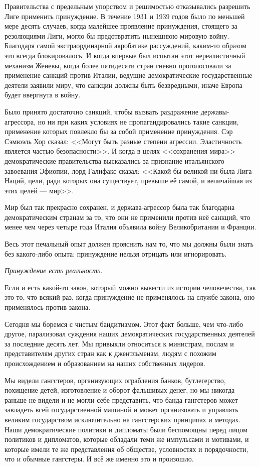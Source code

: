 Правительства с предельным упорством и решимостью отказывались разрешить Лиге применить принуждение. В течение 1931 и 1939 годов было по меньшей мере десять случаев, когда малейшее проявление принуждения, стоящего за резолюциями Лиги, могло бы предотвратить нынешнюю мировую войну. Благодаря самой экстраординарной акробатике рассуждений, каким-то образом это всегда блокировалось. И когда впервые был испытан этот нереалистичный механизм Женевы, когда более пятидесяти стран гневно проголосовали за применение санкций против Италии, ведущие демократические государственные деятели заявили миру, что санкции должны быть безвредными, иначе Европа будет ввергнута в войну.

Было принято достаточно санкций, чтобы вызвать раздражение державы-агрессора, но ни при каких условиях не пропагандировались такие санкции, применение которых повлекло бы за собой применение принуждения. Сэр Сэмюэль Хор сказал: <<Могут быть разные степени агрессии. Эластичность является частью безопасности>>. И когда в целях <<сохранения мира>> демократические правительства высказались за признание итальянского завоевания Эфиопии, лорд Галифакс сказал: <<Какой бы великой ни была Лига Наций, цели, ради которых она существует, превыше её самой, и величайшая из этих целей — мир>>.

Мир был так прекрасно сохранен, и держава-агрессор была так благодарна демократическим странам за то, что они не применили против неё санкций, что менее чем через четыре года Италия объявила войну Великобритании и Франции.

Весь этот печальный опыт должен прояснить нам то, что мы должны были знать без какого-либо опыта: принуждение нельзя отрицать или игнорировать.

\textit{Принуждение есть реальность}.

Если и есть какой-то закон, который можно вывести из истории человечества, так это то, что всякий раз, когда принуждение не применялось на службе закона, оно применялось против закона.

Сегодня мы боремся с чистым бандитизмом. Этот факт больше, чем что-либо другое, парализовал суждения наших демократических государственных деятелей за последние десять лет. Мы привыкли относиться к министрам, послам и представителям других стран как к джентльменам, людям с похожим происхождением и образованием на наших собственных лидеров.

Мы видели гангстеров, организующих ограбления банков, бутлегерство, похищение детей, изготовление и оборот фальшивых денег, но мы никогда раньше не видели и не могли себе представить, что банда гангстеров может завладеть всей государственной машиной и может организовать и управлять великим государством исключительно на гангстерских принципах и методах. Наши демократические политики и дипломаты были беспомощны перед лицом политиков и дипломатов, которые обладали теми же импульсами и мотивами, и которые имели те же представления об обществе, условностях и порядочности, что и обычные гангстеры. И всё же именно это и произошло.

